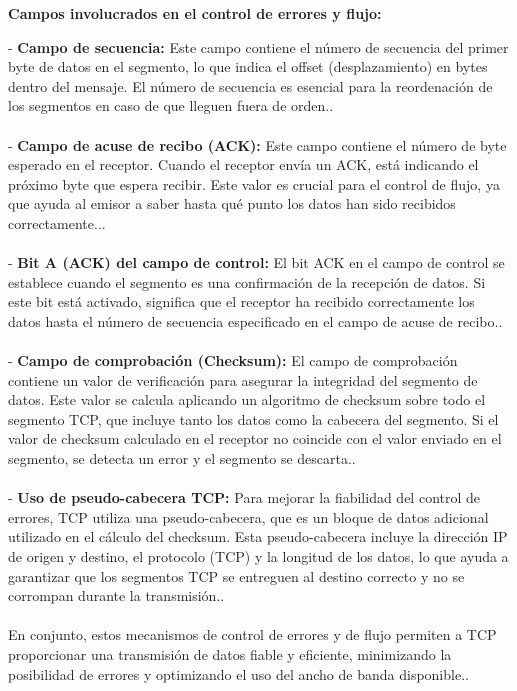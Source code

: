 \documentclass[a4paper,12pt]{article}
\begin{document}
\textbf{Campos involucrados en el control de errores y flujo:}

- \textbf{Campo de secuencia:} Este campo contiene el número de secuencia del primer byte de datos en el segmento, lo que indica el offset (desplazamiento) en bytes dentro del mensaje. El número de secuencia es esencial para la reordenación de los segmentos en caso de que lleguen fuera de orden..\\\\
  
- \textbf{Campo de acuse de recibo (ACK):} Este campo contiene el número de byte esperado en el receptor. Cuando el receptor envía un ACK, está indicando el próximo byte que espera recibir. Este valor es crucial para el control de flujo, ya que ayuda al emisor a saber hasta qué punto los datos han sido recibidos correctamente... \\\\

- \textbf{Bit A (ACK) del campo de control:} El bit ACK en el campo de control se establece cuando el segmento es una confirmación de la recepción de datos. Si este bit está activado, significa que el receptor ha recibido correctamente los datos hasta el número de secuencia especificado en el campo de acuse de recibo..\\\\

- \textbf{Campo de comprobación (Checksum):} El campo de comprobación contiene un valor de verificación para asegurar la integridad del segmento de datos. Este valor se calcula aplicando un algoritmo de checksum sobre todo el segmento TCP, que incluye tanto los datos como la cabecera del segmento. Si el valor de checksum calculado en el receptor no coincide con el valor enviado en el segmento, se detecta un error y el segmento se descarta..\\\\

- \textbf{Uso de pseudo-cabecera TCP:} Para mejorar la fiabilidad del control de errores, TCP utiliza una pseudo-cabecera, que es un bloque de datos adicional utilizado en el cálculo del checksum. Esta pseudo-cabecera incluye la dirección IP de origen y destino, el protocolo (TCP) y la longitud de los datos, lo que ayuda a garantizar que los segmentos TCP se entreguen al destino correcto y no se corrompan durante la transmisión..\\\\

En conjunto, estos mecanismos de control de errores y de flujo permiten a TCP proporcionar una transmisión de datos fiable y eficiente, minimizando la posibilidad de errores y optimizando el uso del ancho de banda disponible..\\\\
\end{document}
